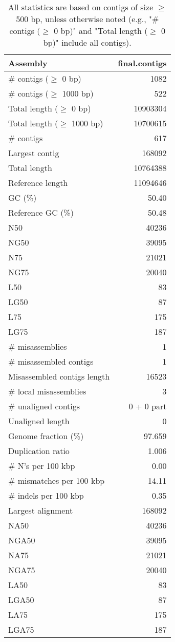 \documentclass[12pt,a4paper]{article}
\begin{document}
\begin{table}[ht]
\begin{center}
\caption{All statistics are based on contigs of size $\geq$ 500 bp, unless otherwise noted (e.g., "\# contigs ($\geq$ 0 bp)" and "Total length ($\geq$ 0 bp)" include all contigs).}
\begin{tabular}{|l*{1}{|r}|}
\hline
Assembly & final.contigs \\ \hline
\# contigs ($\geq$ 0 bp) & 1082 \\ \hline
\# contigs ($\geq$ 1000 bp) & 522 \\ \hline
Total length ($\geq$ 0 bp) & 10903304 \\ \hline
Total length ($\geq$ 1000 bp) & 10700615 \\ \hline
\# contigs & 617 \\ \hline
Largest contig & 168092 \\ \hline
Total length & 10764388 \\ \hline
Reference length & 11094646 \\ \hline
GC (\%) & 50.40 \\ \hline
Reference GC (\%) & 50.48 \\ \hline
N50 & 40236 \\ \hline
NG50 & 39095 \\ \hline
N75 & 21021 \\ \hline
NG75 & 20040 \\ \hline
L50 & 83 \\ \hline
LG50 & 87 \\ \hline
L75 & 175 \\ \hline
LG75 & 187 \\ \hline
\# misassemblies & 1 \\ \hline
\# misassembled contigs & 1 \\ \hline
Misassembled contigs length & 16523 \\ \hline
\# local misassemblies & 3 \\ \hline
\# unaligned contigs & 0 + 0 part \\ \hline
Unaligned length & 0 \\ \hline
Genome fraction (\%) & 97.659 \\ \hline
Duplication ratio & 1.006 \\ \hline
\# N's per 100 kbp & 0.00 \\ \hline
\# mismatches per 100 kbp & 14.11 \\ \hline
\# indels per 100 kbp & 0.35 \\ \hline
Largest alignment & 168092 \\ \hline
NA50 & 40236 \\ \hline
NGA50 & 39095 \\ \hline
NA75 & 21021 \\ \hline
NGA75 & 20040 \\ \hline
LA50 & 83 \\ \hline
LGA50 & 87 \\ \hline
LA75 & 175 \\ \hline
LGA75 & 187 \\ \hline
\end{tabular}
\end{center}
\end{table}
\end{document}
